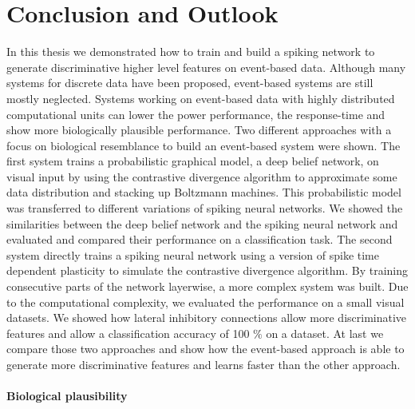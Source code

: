 \chapter{Conclusion and Outlook} \label{c:conclusion}

In this thesis we demonstrated how to train and build a spiking network to generate discriminative higher level features on event-based data.
Although many systems for discrete data have been proposed, event-based systems are still mostly neglected.
Systems working on event-based data with highly distributed computational units can lower the power performance, the response-time and show more biologically plausible performance.  
Two different approaches with a focus on biological resemblance to build an event-based system were shown.
The first system trains a probabilistic graphical model, a deep belief network, on visual input by using the contrastive divergence algorithm to approximate some data distribution and stacking up Boltzmann machines.
This probabilistic model was transferred to different variations of spiking neural networks.
We showed the similarities between the deep belief network and the spiking neural network and evaluated and compared their performance on a classification task.   
The second system directly trains a spiking neural network using a version of spike time dependent plasticity to simulate the contrastive divergence algorithm. By training consecutive parts of the network layerwise, a more complex system was built. Due to the computational complexity, we evaluated the performance on a small visual datasets. We showed how lateral inhibitory connections allow more discriminative features and allow a classification accuracy of 100 $\%$ on a dataset.
At last we compare those two approaches and show how the event-based approach is able to generate more discriminative features and learns faster than the other approach.  

\subsubsection{Biological plausibility} \label{c:bioplau}

